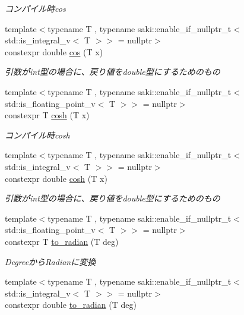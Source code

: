 \begin{DoxyCompactItemize}
\begin{DoxyCompactList}\small\item\em コンパイル時cos \end{DoxyCompactList}\item 
{\footnotesize template$<$typename T , typename saki\+::enable\+\_\+if\+\_\+nullptr\+\_\+t$<$ std\+::is\+\_\+integral\+\_\+v$<$ T $>$$>$  = nullptr$>$ }\\constexpr double \mbox{\hyperlink{namespacesaki_ab1f49aa2d1182883ae8b4c01b346cc88}{cos}} (T x)
\begin{DoxyCompactList}\small\item\em 引数がint型の場合に、戻り値をdouble型にするためのもの \end{DoxyCompactList}\item 
{\footnotesize template$<$typename T , typename saki\+::enable\+\_\+if\+\_\+nullptr\+\_\+t$<$ std\+::is\+\_\+floating\+\_\+point\+\_\+v$<$ T $>$$>$  = nullptr$>$ }\\constexpr T \mbox{\hyperlink{namespacesaki_a0f8167af6da5c9eb510d33dadae13708}{cosh}} (T x)
\begin{DoxyCompactList}\small\item\em コンパイル時cosh \end{DoxyCompactList}\item 
{\footnotesize template$<$typename T , typename saki\+::enable\+\_\+if\+\_\+nullptr\+\_\+t$<$ std\+::is\+\_\+integral\+\_\+v$<$ T $>$$>$  = nullptr$>$ }\\constexpr double \mbox{\hyperlink{namespacesaki_afe248729248030bd5858469409e902d2}{cosh}} (T x)
\begin{DoxyCompactList}\small\item\em 引数がint型の場合に、戻り値をdouble型にするためのもの \end{DoxyCompactList}\item 
{\footnotesize template$<$typename T , typename saki\+::enable\+\_\+if\+\_\+nullptr\+\_\+t$<$ std\+::is\+\_\+floating\+\_\+point\+\_\+v$<$ T $>$$>$  = nullptr$>$ }\\constexpr T \mbox{\hyperlink{namespacesaki_a27595b1e53058ce792db7f8d29e2e9af}{to\+\_\+radian}} (T deg)
\begin{DoxyCompactList}\small\item\em Degreeから\+Radianに変換 \end{DoxyCompactList}\item 
{\footnotesize template$<$typename T , typename saki\+::enable\+\_\+if\+\_\+nullptr\+\_\+t$<$ std\+::is\+\_\+integral\+\_\+v$<$ T $>$$>$  = nullptr$>$ }\\constexpr double \mbox{\hyperlink{namespacesaki_aa671d122197cf10439eee0d271f51fe6}{to\+\_\+radian}} (T deg)

\end{DoxyCompactItemize}
